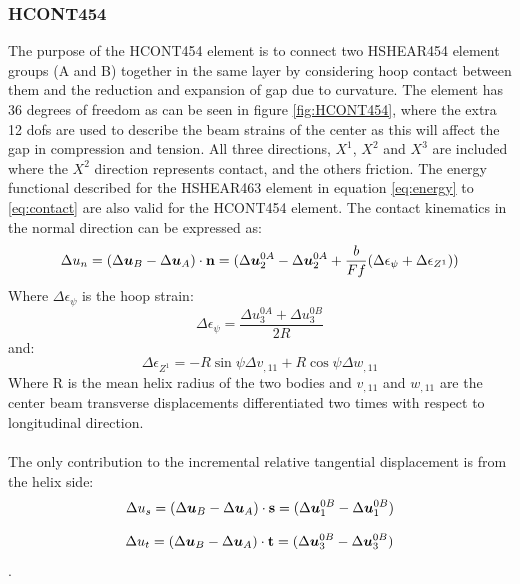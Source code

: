 \subsubsection{HCONT454}
The purpose of the HCONT454 element is to connect two HSHEAR454 element groups (A and B) together in the same layer by considering hoop contact between them and the reduction and expansion of gap due to curvature. The element has 36 degrees of freedom as can be seen in figure \ref{fig:HCONT454},  where the extra 12 dofs are used to describe the beam strains of the center as this will affect the gap in compression and tension. All three directions, $X^1$, $X^2$ and $X^3$ are included where the $X^2$ direction represents contact, and the others friction. The energy functional described for the HSHEAR463 element in equation \ref{eq:energy} to \ref{eq:contact} are also valid for the HCONT454 element. The contact kinematics in the normal direction can be expressed as: 
\begin{equation}
    \Delta u_n=(\Delta \boldsymbol{u}_B-\Delta \boldsymbol{u}_A) \cdot \bold{n}=(\Delta \boldsymbol{u}_2^{0A}-\Delta \boldsymbol{u}_2^{0A}+\frac{b}{Ff}(\Delta \epsilon_\psi+\Delta \epsilon_{Z^1}))
\end{equation}
\noindent Where $ \Delta \epsilon_\psi$ is the hoop strain:
\begin{equation}
    \Delta \epsilon_\psi =\frac{\Delta u_3^{0A} + \Delta u_3^{0B}}{2R}
\end{equation}
and:
\begin{equation}
    \Delta \epsilon_{Z^1} = -R \sin \psi \Delta v_{,11} + R \cos \psi \Delta w_{,11}
\end{equation}
Where R is the mean helix radius of the two bodies and $v_{,11}$ and $w_{,11}$ are the center beam transverse displacements differentiated  two times with respect to longitudinal direction. \\\\ The only contribution to the  incremental relative tangential displacement is from the helix side:
\begin{equation}
    \Delta u_s = (\Delta \boldsymbol{u}_B -\Delta \boldsymbol{u}_A) \cdot \bold{s}=(\Delta \boldsymbol{u}_1^{0B} -\Delta \boldsymbol{u}_1^{0B})
\end{equation}

\begin{equation}
    \Delta u_t = (\Delta \boldsymbol{u}_B -\Delta \boldsymbol{u}_A) \cdot \bold{t}=(\Delta \boldsymbol{u}_3^{0B} -\Delta \boldsymbol{u}_3^{0B})
\end{equation}. 

